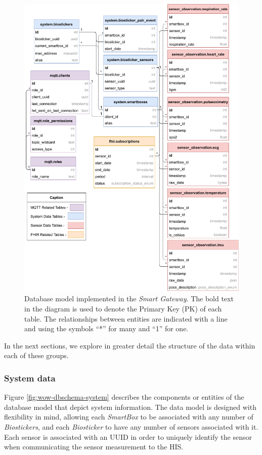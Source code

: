\begin{figure}[H]
    \centering
    \includegraphics[width=0.9\linewidth]{images/database-schema-general.pdf}
    \caption[Database model implemented in the \textit{Smart Gateway}.]{Database model implemented in the \textit{Smart Gateway}. The bold text in the diagram is used to denote the Primary Key (PK) of each table. The relationships between entities are indicated with a line and using the symbols ``*'' for many and ``1'' for one.}
    \label{fig:wow-dbschema-full}
\end{figure}

In the next sections, we explore in greater detail the structure of the data within each of these groups.

\subsubsection{System data}
Figure \ref{fig:wow-dbschema-system} describes the components or entities of the database model that depict system information. The data model is designed with flexibility in mind, allowing each \textit{SmartBox} to be associated with any number of \textit{Biostickers}, and each \textit{Biosticker} to have any number of sensors associated with it. Each sensor is associated with an \acs{UUID} in order to uniquely identify the sensor when communicating the sensor measurement to the \acs{HIS}.

